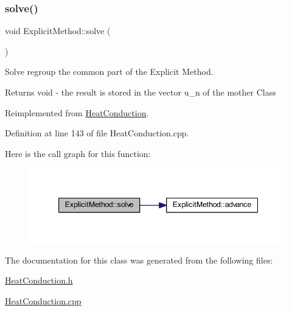 \subsubsection{\texorpdfstring{solve()}{solve()}}
{\footnotesize\ttfamily void Explicit\+Method\+::solve (\begin{DoxyParamCaption}{ }\end{DoxyParamCaption})\hspace{0.3cm}{\ttfamily [virtual]}}



Solve regroup the common part of the Explicit Method. 

\begin{DoxyReturn}{Returns}
void -\/ the result is stored in the vector u\+\_\+n of the mother Class 
\end{DoxyReturn}


Reimplemented from \hyperlink{class_heat_conduction_ac176ea1a94c2fdb0da017b987ea22d1c}{Heat\+Conduction}.



Definition at line 143 of file Heat\+Conduction.\+cpp.

Here is the call graph for this function\+:\nopagebreak
\begin{figure}[H]
\begin{center}
\leavevmode
\includegraphics[width=347pt]{class_explicit_method_a096efa29c4315794c60182e31c54a45e_cgraph}
\end{center}
\end{figure}


The documentation for this class was generated from the following files\+:\begin{DoxyCompactItemize}
\item 
\hyperlink{_heat_conduction_8h}{Heat\+Conduction.\+h}\item 
\hyperlink{_heat_conduction_8cpp}{Heat\+Conduction.\+cpp}\end{DoxyCompactItemize}
